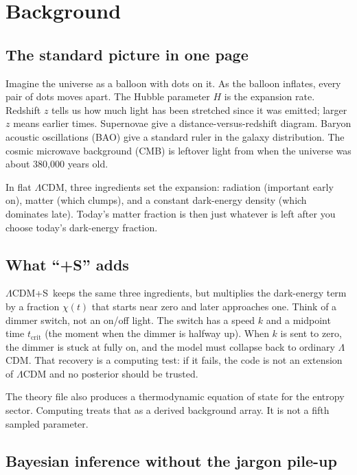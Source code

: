 \documentclass[12pt,letterpaper]{article}
\newcommand{\Lcdms}{$\Lambda$CDM+S}
\newcommand{\tcrit}{t_{\mathrm{crit}}}
\begin{document}
\section{Background}

\subsection{The standard picture in one page}

Imagine the universe as a balloon with dots on it. As the balloon
inflates, every pair of dots moves apart. The Hubble parameter $H$ is
the expansion rate. Redshift $z$ tells us how much light has been
stretched since it was emitted; larger $z$ means earlier times.
Supernovae give a distance-versus-redshift diagram. Baryon acoustic
oscillations (BAO) give a standard ruler in the galaxy distribution.
The cosmic microwave background (CMB) is leftover light from when the
universe was about 380{,}000 years old.

In flat $\Lambda$CDM, three ingredients set the expansion: radiation
(important early on), matter (which clumps), and a constant dark-energy
density (which dominates late). Today's matter fraction is then just
whatever is left after you choose today's dark-energy fraction.

\subsection{What ``+S'' adds}

\Lcdms\ keeps the same three ingredients, but multiplies the dark-energy
term by a fraction $\chi(t)$ that starts near zero and later approaches
one. Think of a dimmer switch, not an on/off light. The switch has a
speed $k$ and a midpoint time $\tcrit$ (the moment when the dimmer is
halfway up). When $k$ is sent to zero, the dimmer is stuck at fully on,
and the model must collapse back to ordinary $\Lambda$CDM. That recovery
is a computing test: if it fails, the code is not an extension of
$\Lambda$CDM and no posterior should be trusted.

The theory file also produces a thermodynamic equation of state for the
entropy sector. Computing treats that as a derived background array. It
is not a fifth sampled parameter.

\subsection{Bayesian inference without the jargon pile-up}
\end{document}
